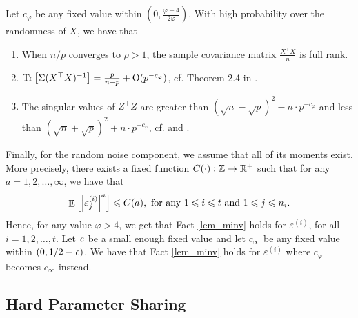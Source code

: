 \begin{fact}\label{lem_minv}
	Let $c_{\varphi}$ be any fixed value within $(0, \frac{\varphi - 4}{2\varphi})$.
	With high probability over the randomness of $X$, we have that
	\begin{enumerate}
		\item When $n / p$ converges to $\rho > 1$, the sample covariance matrix $\frac{X^{\top}X}{n}$ is full rank.
		\item $\operatorname{Tr}\left[\Sigma (X^{\top} X)^{-1}\right] = \frac{p}{n - p} + \operatorname{O}(p^{-c_{\varphi}})$, cf. Theorem 2.4 in \citet{isotropic}.
		\item The singular values of $Z^{\top}Z$ are greater than $(\sqrt{n} - \sqrt{p})^2 - n \cdot p^{-c_{\varphi}}$ and less than $(\sqrt{n} + \sqrt{p})^2 + n \cdot p^{-c_{\varphi}}$, cf. \citet[Theorem 2.10]{isotropic} and \citet[Lemma 3.12]{DY}.
	\end{enumerate}
\end{fact}

Finally, for the random noise component, we assume that all of its moments exist.
More precisely, there exists a fixed function $C(\cdot) : \mathbb{Z} \rightarrow \mathbb{R}^+$ such that for any $a = 1, 2, \dots, \infty$, we have that
\begin{align}\label{assmAhigh2}
	\mathop{\mathbb{E}}\left[ \left\lvert\varepsilon_{j}^{(i)}\right\rvert^a \right] \leqslant C(a), \text{ for any } 1\leqslant i\leqslant t \text{ and } 1\leqslant j\leqslant n_i.
\end{align}
Hence, for any value $\varphi > 4$, we get that Fact \ref{lem_minv} holds for $\varepsilon^{(i)}$, for all $i = 1, 2, \dots, t$.
Let ${\mathit{c}}$ be a small enough fixed value and let $c_{\infty}$ be any fixed value within $(0, 1/2-{\mathit{c}})$.
We have that Fact \ref{lem_minv} holds for $\varepsilon^{(i)}$ where $c_{\varphi}$ becomes $c_{\infty}$ instead.

\subsection{Hard Parameter Sharing}\label{sec_hps}

